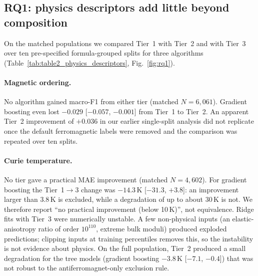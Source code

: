 \documentclass[pdflatex,sn-nature]{sn-jnl}
\begin{document}
\subsection{RQ1: physics descriptors add little beyond composition}\label{sec:rq1}

On the matched populations we compared Tier~1 with Tier~2 and with Tier~3 over ten pre-specified formula-grouped splits for three algorithms (Table~\ref{tab:table2_physics_descriptors}, Fig.~\ref{fig:rq1}).

\paragraph{Magnetic ordering.} No algorithm gained macro-F1 from either tier (matched $N=6{,}061$). Gradient boosting even lost $-0.029$ [$-0.057$, $-0.001$] from Tier~1 to Tier~2. An apparent Tier~2 improvement of $+0.036$ in our earlier single-split analysis did not replicate once the default ferromagnetic labels were removed and the comparison was repeated over ten splits.

\paragraph{Curie temperature.} No tier gave a practical MAE improvement (matched $N=4{,}602$). For gradient boosting the Tier~1$\rightarrow$3 change was $-14.3$\,K [$-31.3$, $+3.8$]: an improvement larger than 3.8\,K is excluded, while a degradation of up to about 30\,K is not. We therefore report ``no practical improvement (below 10\,K)'', not equivalence. Ridge fits with Tier~3 were numerically unstable. A few non-physical inputs (an elastic-anisotropy ratio of order $10^{110}$, extreme bulk moduli) produced exploded predictions; clipping inputs at training percentiles removes this, so the instability is not evidence about physics. On the full population, Tier~2 produced a small degradation for the tree models (gradient boosting $-3.8$\,K [$-7.1$, $-0.4$]) that was not robust to the antiferromagnet-only exclusion rule.
\end{document}
